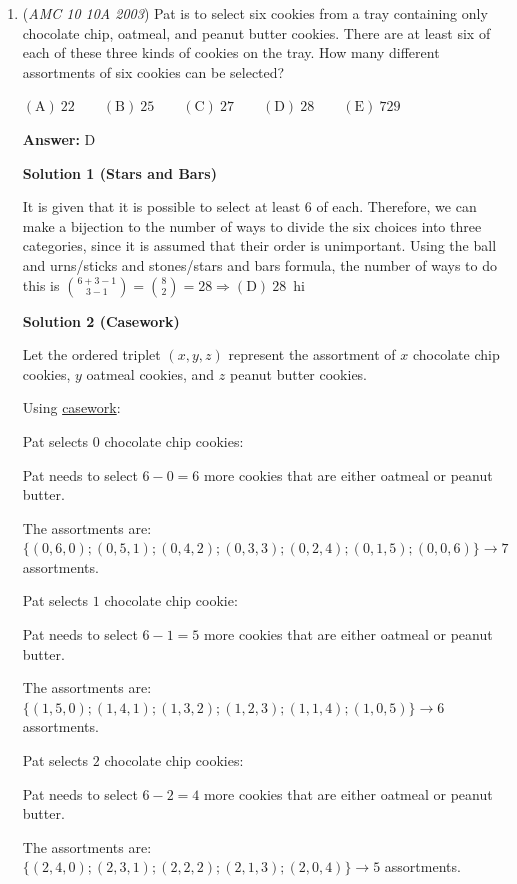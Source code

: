 \begin{enumerate}
 


	\item (\textit{AMC 10 10A 2003}) Pat is to select six cookies from a tray containing only chocolate chip, oatmeal, and peanut butter cookies. There are at least six of each of these three kinds of cookies on the tray. How many different assortments of six cookies can be selected? 


 $\mathrm{(A) \ } 22\qquad \mathrm{(B) \ } 25\qquad \mathrm{(C) \ } 27\qquad \mathrm{(D) \ } 28\qquad \mathrm{(E) \ } 729$

 \textbf{Answer: }D



\textbf{Solution 1 (Stars and Bars)}

It is given that it is possible to select at least 6 of each. Therefore, we can make a bijection to the number of ways to divide the six choices into three categories, since it is assumed that their order is unimportant. Using the ball and urns/sticks and stones/stars and bars formula, the number of ways to do this is $\binom{6+3-1}{3-1}=\binom{8}{2} = 28 \Rightarrow\boxed{\mathrm{(D)}\ 28}$~hi

 



\textbf{Solution 2 (Casework)}

Let the ordered triplet $(x,y,z)$ represent the assortment of $x$ chocolate chip cookies, $y$ oatmeal cookies, and $z$ peanut butter cookies. 

 Using \href{https://artofproblemsolving.com/wiki/index.php?title=Casework}{casework}: 

 Pat selects $0$ chocolate chip cookies: 

 Pat needs to select $6-0=6$ more cookies that are either oatmeal or peanut butter. 

 The assortments are: $\{(0,6,0); (0,5,1); (0,4,2); (0,3,3); (0,2,4); (0,1,5); (0,0,6)\} \rightarrow 7$ assortments. 

 Pat selects $1$ chocolate chip cookie: 

 Pat needs to select $6-1=5$ more cookies that are either oatmeal or peanut butter. 

 The assortments are: $\{(1,5,0); (1,4,1); (1,3,2); (1,2,3); (1,1,4); (1,0,5) \} \rightarrow 6$ assortments. 

 Pat selects $2$ chocolate chip cookies: 

 Pat needs to select $6-2=4$ more cookies that are either oatmeal or peanut butter. 

 The assortments are: $\{(2,4,0); (2,3,1); (2,2,2); (2,1,3); (2,0,4)\} \rightarrow 5$ assortments. 


\end{enumerate}
